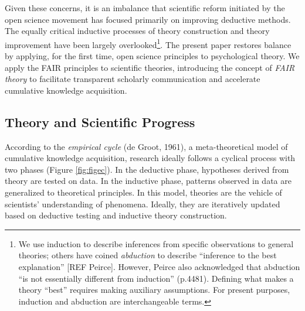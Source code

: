 \documentclass[
  man,floatsintext]{apa6}
\begin{document}
Given these concerns, it is an imbalance that scientific reform initiated by the open science movement has focused primarily on improving deductive methods.
The equally critical inductive processes of theory construction and theory improvement have been largely overlooked\footnote{We use induction to describe inferences from specific observations to general theories; others have coined \emph{abduction} to describe ``inference to the best explanation'' {[}REF Peirce{]}. However, Peirce also acknowledged that abduction ``is not essentially different from induction'' (p.4481). Defining what makes a theory ``best'' requires making auxiliary assumptions. For present purposes, induction and abduction are interchangeable terms.}.
The present paper restores balance by applying, for the first time,
open science principles to psychological theory.
We apply the FAIR principles to scientific theories,
introducing the concept of \emph{FAIR theory} to
facilitate transparent scholarly communication and accelerate cumulative knowledge acquisition.

\subsection{Theory and Scientific Progress}\label{theory-and-scientific-progress}

According to the \emph{empirical cycle} (de Groot, 1961),
a meta-theoretical model of cumulative knowledge acquisition,
research ideally follows a cyclical process with two phases (Figure \ref{fig:figec}).
In the deductive phase, hypotheses derived from theory are tested on data. In the inductive phase, patterns observed in data are generalized to theoretical principles.
In this model, theories are the vehicle of scientists' understanding of phenomena.
Ideally, they are iteratively updated based on deductive testing and inductive theory construction.
\end{document}
